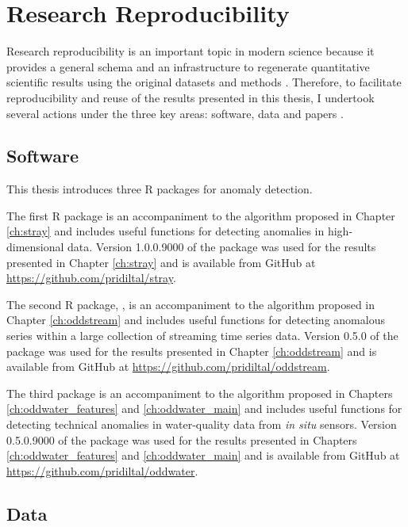 \documentclass{monashthesis}
\theoremstyle{definition}
\theoremstyle{definition}
\theoremstyle{definition}
\theoremstyle{remark}
\begin{document}
\hypertarget{research-reproducibility}{%
\section{Research Reproducibility}\label{research-reproducibility}}

Research reproducibility is an important topic in modern science because it provides a general schema and an infrastructure to regenerate quantitative scientific results using the original datasets and methods \autocite{stodden2014implementing}. Therefore, to facilitate reproducibility and reuse of the results presented in this thesis, I undertook several actions under the three key areas: software, data and papers \autocite{stodden2014implementing}.

\hypertarget{software}{%
\subsection{Software}\label{software}}

This thesis introduces three R packages for anomaly detection.

The first R package is an accompaniment to the algorithm proposed in Chapter \ref{ch:stray} and includes useful functions for detecting anomalies in high-dimensional data. Version 1.0.0.9000 of the package was used for the results presented in Chapter \ref{ch:stray} and is available from GitHub at \url{https://github.com/pridiltal/stray}.

The second R package, , is an accompaniment to the algorithm proposed in Chapter \ref{ch:oddstream} and includes useful functions for detecting anomalous series within a large collection of streaming time series data. Version 0.5.0 of the package was used for the results presented in Chapter \ref{ch:oddstream} and is available from GitHub at \url{https://github.com/pridiltal/oddstream}.

The third package is an accompaniment to the algorithm proposed in Chapters \ref{ch:oddwater_features} and \ref{ch:oddwater_main} and includes useful functions for detecting technical anomalies in water-quality data from \emph{in situ} sensors. Version 0.5.0.9000 of the package was used for the results presented in Chapters \ref{ch:oddwater_features} and \ref{ch:oddwater_main} and is available from GitHub at \url{https://github.com/pridiltal/oddwater}.

\hypertarget{data}{%
\subsection{Data}\label{data}}
\end{document}
